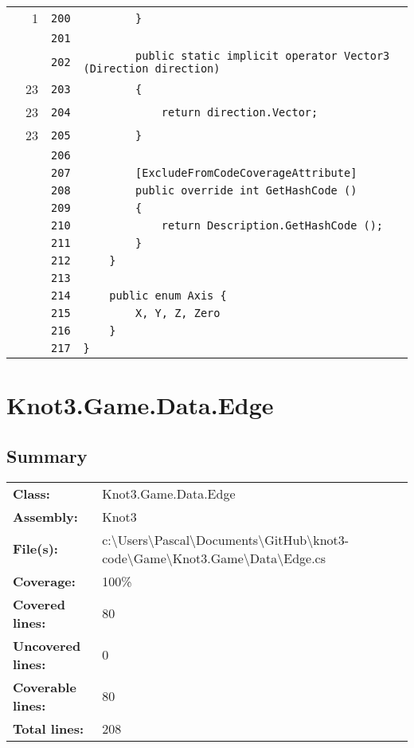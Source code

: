 \documentclass[a4paper,10pt]{article}
\begin{document}
\begin{longtable}[l]{lrrl}
\cellcolor{green} & 1 & \verb~200~ & \verb~        }~\\
\cellcolor{gray} &  & \verb~201~ & \verb~~\\
\cellcolor{gray} &  & \verb~202~ & \verb~        public static implicit operator Vector3 (Direction direction)~\\
\cellcolor{green} & 23 & \verb~203~ & \verb~        {~\\
\cellcolor{green} & 23 & \verb~204~ & \verb~            return direction.Vector;~\\
\cellcolor{green} & 23 & \verb~205~ & \verb~        }~\\
\cellcolor{gray} &  & \verb~206~ & \verb~~\\
\cellcolor{gray} &  & \verb~207~ & \verb~        [ExcludeFromCodeCoverageAttribute]~\\
\cellcolor{gray} &  & \verb~208~ & \verb~        public override int GetHashCode ()~\\
\cellcolor{gray} &  & \verb~209~ & \verb~        {~\\
\cellcolor{gray} &  & \verb~210~ & \verb~            return Description.GetHashCode ();~\\
\cellcolor{gray} &  & \verb~211~ & \verb~        }~\\
\cellcolor{gray} &  & \verb~212~ & \verb~    }~\\
\cellcolor{gray} &  & \verb~213~ & \verb~~\\
\cellcolor{gray} &  & \verb~214~ & \verb~    public enum Axis {~\\
\cellcolor{gray} &  & \verb~215~ & \verb~        X, Y, Z, Zero~\\
\cellcolor{gray} &  & \verb~216~ & \verb~    }~\\
\cellcolor{gray} &  & \verb~217~ & \verb~}~\\
\end{longtable}
\newpage
\section{Knot3.Game.Data.Edge}
\subsection{Summary}
\begin{longtable}[l]{ll}
\textbf{Class:} & Knot3.Game.Data.Edge\\
\textbf{Assembly:} & Knot3\\
\textbf{File(s):} & \begin{minipage}[t]{12cm}{c:\textbackslash Users\textbackslash Pascal\textbackslash Documents\textbackslash GitHub\textbackslash knot3-code\textbackslash Game\textbackslash Knot3.Game\textbackslash Data\textbackslash Edge.cs}\end{minipage} \\
\textbf{Coverage:} & 100\%\\
\textbf{Covered lines:} & 80\\
\textbf{Uncovered lines:} & 0\\
\textbf{Coverable lines:} & 80\\
\textbf{Total lines:} & 208\\
\end{longtable}
\end{document}

